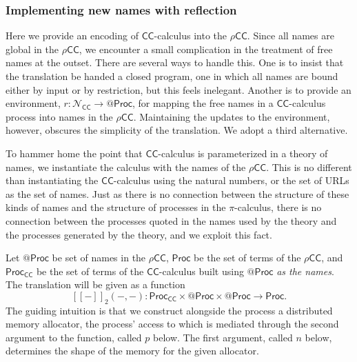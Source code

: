\documentclass[submission,copyright,creativecommons]{eptcs}
\makeatletter
\newcommand{\pic}{$\pi$-calculus}
\newcommand{\ccomb}{$\mathsf{CC}$-calculus}
\newcommand{\ldb}{[\![}
\newcommand{\rdb}{]\!]}
\newcommand{\quotep}[1]{\mathsf{@}#1}
\newcommand{\meaningof}[1]{\ldb #1 \rdb}
\newcommand{\Proc}{\mathsf{Proc}}
\newcommand{\QProc}{\quotep{\mathsf{Proc}}}
\newcommand{\red}{\rightarrow}
\newcommand{\rhocc}{$\rho$$\mathsf{CC}$}
\theoremstyle{definition}
\theoremstyle{remark}
\theoremstyle{remark}
\makeatother
\begin{document}
\subsubsection{Implementing new names with reflection}

Here we provide an encoding of {\ccomb} into the {\rhocc}. Since all
names are global in the {\rhocc}, we encounter a small complication in
the treatment of free names at the outset. There are several ways to
handle this.  One is to insist that the translation be handed a closed
program, one in which all names are bound either by input or by
restriction, but this feels inelegant. Another is to provide an
environment, $r : \mathcal{N}_{\mathsf{CC}} \rightarrow \QProc$, for
mapping the free names in a {\ccomb} process into names in the
{\rhocc}. Maintaining the updates to the environment, however,
obscures the simplicity of the translation. We adopt a third
alternative.

To hammer home the point that {\ccomb} is parameterized in a theory of
names, we instantiate the calculus with the names of the
{\rhocc}. This is no different than instantiating the {\ccomb} using
the natural numbers, or the set of URLs as the set of names. Just as
there is no connection between the structure of these kinds of names
and the structure of processes in the {\pic}, there is no connection
between the processes quoted in the names used by the theory and the
processes generated by the theory, and we exploit this fact.

Let $\QProc$ be set of names in the {\rhocc}, $\Proc$ be the set of
terms of the {\rhocc}, and $\Proc_{\mathsf{CC}}$ be the set of terms
of the {\ccomb} built using $\QProc$ \emph{as the names}. The
translation will be given as a function \[\meaningof{-}_2( -,
- ) : \Proc_{\mathsf{CC}} \times \QProc {\times} \QProc \red \Proc.\]
The guiding intuition is that we construct alongside the process a
distributed memory allocator, the process' access to which is mediated
through the second argument to the function, called $p$ below. The
first argument, called $n$ below, determines the shape of the memory
for the given allocator.
\end{document}
